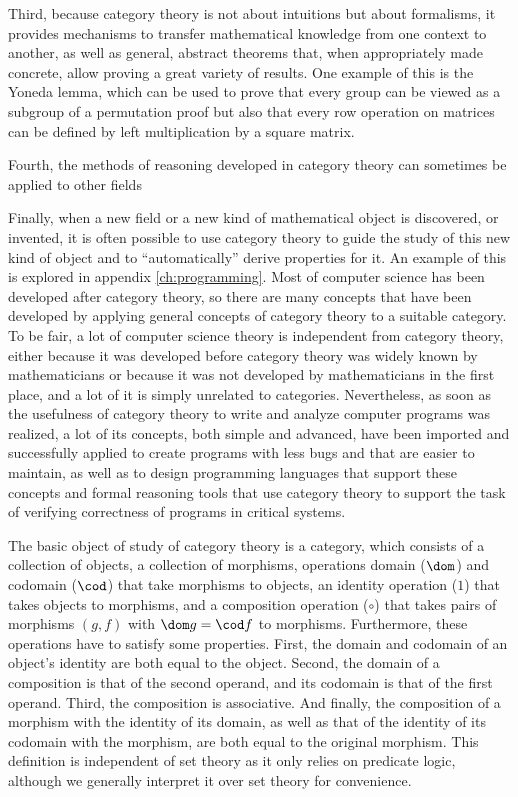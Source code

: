 Third, because category theory is not about intuitions but about formalisms, it
provides mechanisms to transfer mathematical knowledge from one context to
another, as well as general, abstract theorems that, when appropriately made
concrete, allow proving a great variety of results. One example of this is the
Yoneda lemma, which can be used to prove that every group can be viewed as a
subgroup of a permutation proof but also that every row operation on matrices
can be defined by left multiplication by a square matrix.

Fourth, the methods of reasoning developed in category theory can sometimes be
applied to other fields

Finally, when a new field or a new kind of mathematical object is discovered, or
invented, it is often possible to use category theory to guide the study of this
new kind of object and to ``automatically'' derive properties for it. An example
of this is explored in appendix \ref{ch:programming}. Most of computer science
has been developed after category theory, so there are many concepts that have
been developed by applying general concepts of category theory to a suitable
category. To be fair, a lot of computer science theory is independent from
category theory, either because it was developed before category theory was
widely known by mathematicians or because it was not developed by mathematicians
in the first place, and a lot of it is simply unrelated to
categories. Nevertheless, as soon as the usefulness of category theory to write
and analyze computer programs was realized, a lot of its concepts, both simple
and advanced, have been imported and successfully applied to create programs
with less bugs and that are easier to maintain, as well as to design programming
languages that support these concepts and formal reasoning tools that use
category theory to support the task of verifying correctness of programs in
critical systems.

The basic object of study of category theory is a category, which consists of a
collection of objects, a collection of morphisms, operations domain ($\dom$) and
codomain ($\cod$) that take morphisms to objects, an identity operation ($1$)
that takes objects to morphisms, and a composition operation ($\circ$) that
takes pairs of morphisms $(g,f)$ with $\dom g=\cod f$ to morphisms. Furthermore,
these operations have to satisfy some properties. First, the domain and codomain
of an object's identity are both equal to the object. Second, the domain of a
composition is that of the second operand, and its codomain is that of the first
operand. Third, the composition is associative. And finally, the composition of
a morphism with the identity of its domain, as well as that of the identity of
its codomain with the morphism, are both equal to the original morphism. This
definition is independent of set theory as it only relies on predicate logic,
although we generally interpret it over set theory for convenience.

